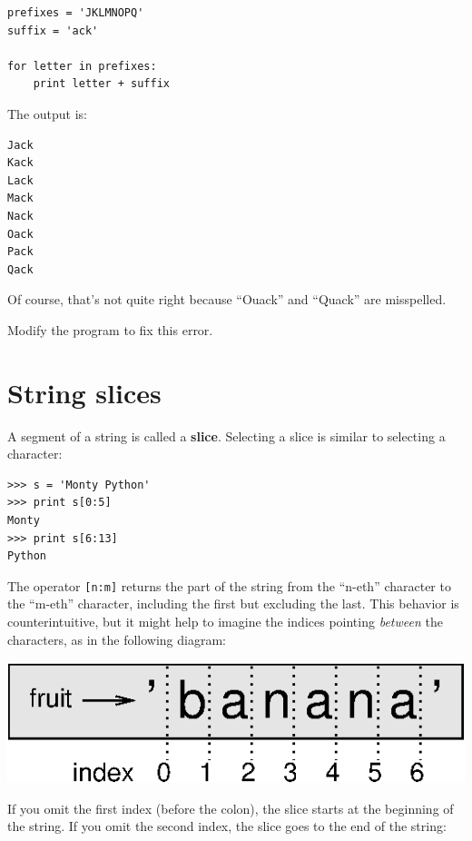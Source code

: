 \documentclass[10pt]{book}
\begin{document}
\beforeverb
\begin{verbatim}
prefixes = 'JKLMNOPQ'
suffix = 'ack'

for letter in prefixes:
    print letter + suffix
\end{verbatim}
\afterverb
%
The output is:

\beforeverb
\begin{verbatim}
Jack
Kack
Lack
Mack
Nack
Oack
Pack
Qack
\end{verbatim}
\afterverb
%
Of course, that's not quite right because ``Ouack'' and
``Quack'' are misspelled.

\begin{ex}
Modify the program to fix this error.
\end{ex}



\section{String slices}
\label{slice}


A segment of a string is called a {\bf slice}.  Selecting a slice is
similar to selecting a character:

\beforeverb
\begin{verbatim}
>>> s = 'Monty Python'
>>> print s[0:5]
Monty
>>> print s[6:13]
Python
\end{verbatim}
\afterverb
%
The operator {\tt [n:m]} returns the part of the string from the 
``n-eth'' character to the ``m-eth'' character, including the first but
excluding the last.  This behavior is counterintuitive, but it might
help to imagine the indices pointing {\em between} the
characters, as in the following diagram:

\beforefig
\centerline{\includegraphics{figs/banana.eps}}
\afterfig

If you omit the first index (before the colon), the slice starts at
the beginning of the string.  If you omit the second index, the slice
goes to the end of the string:
\end{document}
